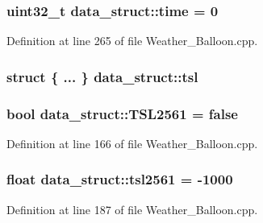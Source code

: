 \subsubsection[{\texorpdfstring{time}{time}}]{\setlength{\rightskip}{0pt plus 5cm}uint32\+\_\+t data\+\_\+struct\+::time = 0}\hypertarget{structdata__struct_ab0d5edba92538e9baf384967459ec221}{}\label{structdata__struct_ab0d5edba92538e9baf384967459ec221}


Definition at line 265 of file Weather\+\_\+\+Balloon.\+cpp.

\subsubsection[{\texorpdfstring{tsl}{tsl}}]{\setlength{\rightskip}{0pt plus 5cm}struct \{ ... \}   data\+\_\+struct\+::tsl}\hypertarget{structdata__struct_ad6c6ac99773f308db955031c4ac87d72}{}\label{structdata__struct_ad6c6ac99773f308db955031c4ac87d72}
\subsubsection[{\texorpdfstring{T\+S\+L2561}{TSL2561}}]{\setlength{\rightskip}{0pt plus 5cm}bool data\+\_\+struct\+::\+T\+S\+L2561 = false}\hypertarget{structdata__struct_a660f4a6dd385f71ff63ff0d4319945d9}{}\label{structdata__struct_a660f4a6dd385f71ff63ff0d4319945d9}


Definition at line 166 of file Weather\+\_\+\+Balloon.\+cpp.

\subsubsection[{\texorpdfstring{tsl2561}{tsl2561}}]{\setlength{\rightskip}{0pt plus 5cm}float data\+\_\+struct\+::tsl2561 = -\/1000}\hypertarget{structdata__struct_a905fd80af00a6ced0390852a03830f56}{}\label{structdata__struct_a905fd80af00a6ced0390852a03830f56}


Definition at line 187 of file Weather\+\_\+\+Balloon.\+cpp.

